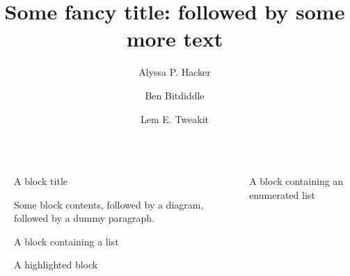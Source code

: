 \documentclass[final]{beamer}
\title{Some fancy title: followed by some more text}
\author{Alyssa P. Hacker \inst{1} \and Ben Bitdiddle \inst{2} \and Lem E. Tweakit \inst{2}}
\institute[shortinst]{\inst{1} Some Institute \samelineand \inst{2} Another Institute}
\newlength{\sepwidth}
\newlength{\colwidth}
\newcommand{\separatorcolumn}{\begin{column}{\sepwidth}\end{column}}
\begin{document}
{
}

\begin{frame}[t]
\begin{columns}[t]
\separatorcolumn

\begin{column}{\colwidth}

  \begin{block}{A block title}

    Some block contents, followed by a diagram, followed by a dummy paragraph.



  \end{block}

  \begin{block}{A block containing a list}


  \end{block}

  \begin{alertblock}{A highlighted block}

  \end{alertblock}

\end{column}

\separatorcolumn

\begin{column}{\colwidth}

  \begin{block}{A block containing an enumerated list}


  \end{block}


\end{column}
\end{columns}
\end{frame}
\end{document}
